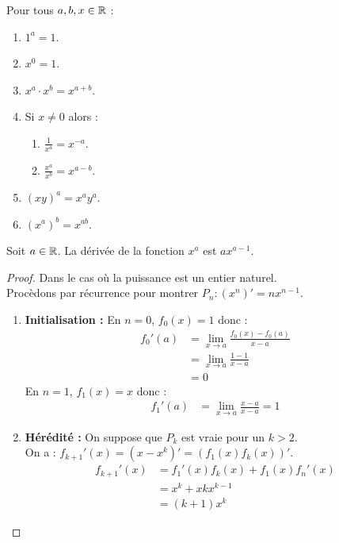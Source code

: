 \begin{proposition}
	Pour tous $a, b, x \in \mathbb{R}$ :
    \begin{enumerate}
            \item $1^a = 1$.
            \item $x^0 = 1$.
            \item $x^a \cdot x^b = x^{a + b}$.
            \item Si $x \neq 0$ alors :
            \begin{enumerate}
            	\item $\frac{1}{x^a} = x^{-a}$.
            	\item $\frac{x^a}{x^b} = x^{a - b}$.
            \end{enumerate}
            \item $(xy)^a = x^a y^a$.
            \item $(x^a)^b = x^{ab}$.
        \end{enumerate}
\end{proposition}

\begin{proposition}
	Soit $a \in \mathbb{R}$. La dérivée de la fonction $x^a$ est $ax^{a-1}$.
\end{proposition}

\begin{proof}
	Dans le cas où la puissance est un entier naturel. \\
	Procèdons par récurrence pour montrer $P_n : (x^n)' = nx^{n-1}$.
	\begin{enumerate}
		\item \textbf{Initialisation :} En $n = 0$, $f_0(x) = 1$ donc :
		\begin{align*}
			f_0'(a) &= \lim_{x \to a} \frac{f_0(x) - f_0(a)}{x - a} \\
			 &= \lim_{x \to a} \frac{1 - 1}{x - a} \\
			 &= 0
		\end{align*}
		En $n = 1$, $f_1(x) = x$ donc :
		\begin{align*}
			f_1'(a) &= \lim_{x \to a} \frac{x - a}{x - a} = 1
		\end{align*}
		\item \textbf{Hérédité :} On suppose que $P_k$ est vraie pour un $k > 2$. \\
		On a : $f_{k+1}'(x) = (x - x^k)' = (f_1(x) f_k(x))'$.
		\begin{align*}
			f_{k+1}'(x) &= f_1'(x) f_k(x) + f_1(x) f_n'(x) \\
			&= x^k + xkx^{k-1} \\
			&= (k+1)x^k 
		\end{align*}
	\end{enumerate}
\end{proof}

